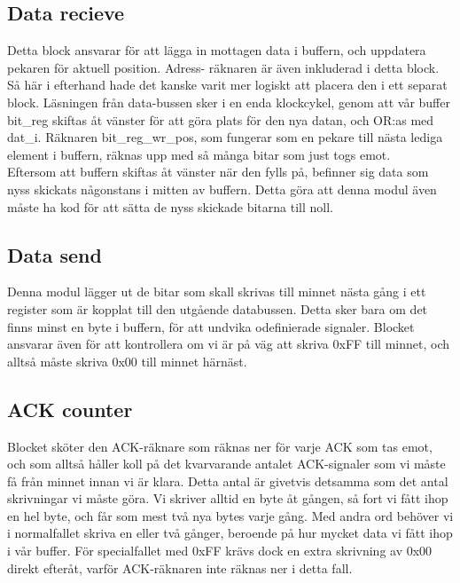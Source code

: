 \documentclass[a4paper]{article}
\begin{document}
\subsection{Data recieve}

Detta block ansvarar för att lägga in mottagen data i buffern, och
uppdatera pekaren för aktuell position. Adress- räknaren är även
inkluderad i detta block. Så här i efterhand hade det kanske varit mer
logiskt att placera den i ett separat block. Läsningen från data-bussen
sker i en enda klockcykel, genom att vår buffer bit\_reg skiftas åt
vänster för att göra plats för den nya datan, och OR:as med dat\_i.
Räknaren bit\_reg\_wr\_pos, som fungerar som en pekare till nästa lediga
element i buffern, räknas upp med så många bitar som just togs emot.\\

Eftersom att buffern skiftas åt vänster när den fylls på, befinner sig
data som nyss skickats någonstans i mitten av buffern. Detta göra att
denna modul även måste ha kod för att sätta de nyss skickade bitarna
till noll.\\


\subsection{Data send}

Denna modul lägger ut de bitar som skall skrivas
till minnet nästa gång i ett register som är kopplat till den utgående
databussen. Detta sker bara om det finns minst en byte i buffern, för
att undvika odefinierade signaler. Blocket ansvarar även för att
kontrollera om vi är på väg att skriva 0xFF till minnet, och alltså
måste skriva 0x00 till minnet härnäst.


\subsection{ACK counter}

Blocket sköter den ACK-räknare som räknas ner för varje ACK som tas
emot, och som alltså håller koll på det kvarvarande antalet ACK-signaler
som vi måste få från minnet innan vi är klara. Detta antal är givetvis
detsamma som det antal skrivningar vi måste göra. Vi skriver alltid en
byte åt gången, så fort vi fått ihop en hel byte, och får som mest två
nya bytes varje gång. Med andra ord behöver vi i normalfallet skriva en
eller två gånger, beroende på hur mycket data vi fått ihop i vår buffer.
För specialfallet med 0xFF krävs dock en extra skrivning av 0x00 direkt
efteråt, varför ACK-räknaren inte räknas ner i detta fall.
\end{document}

